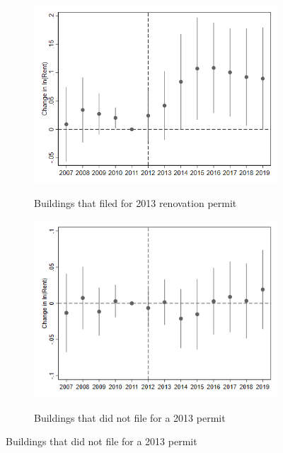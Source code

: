 \documentclass[12pt]{article}
\begin{document}
{{{{{{\begin{figure}[h!]
\begin{center}
\caption{Differential Voucher Rental Impacts for 2013 Job Filings}
\begin{subfigure}[b]{0.4\textwidth}
\caption{Buildings that filed for 2013 renovation permit}
\includegraphics[scale = 0.41]{Renovations/R3.5 High Surge Jobs 2013_all vouchers.png}
\label{fig:highsurgevouchjob}
\end{subfigure}
\hfill
\begin{subfigure}[b]{0.4\textwidth}
\caption{Buildings that did not file for a 2013 permit}
\includegraphics[scale = 0.55]{Renovations/R3.5 High Surge NO Jobs 2013_all vouchers.png}
\label{fig:vouchnojob}
\end{subfigure}
\end{center}
\end{figure}

}}}}}}
\end{document}

